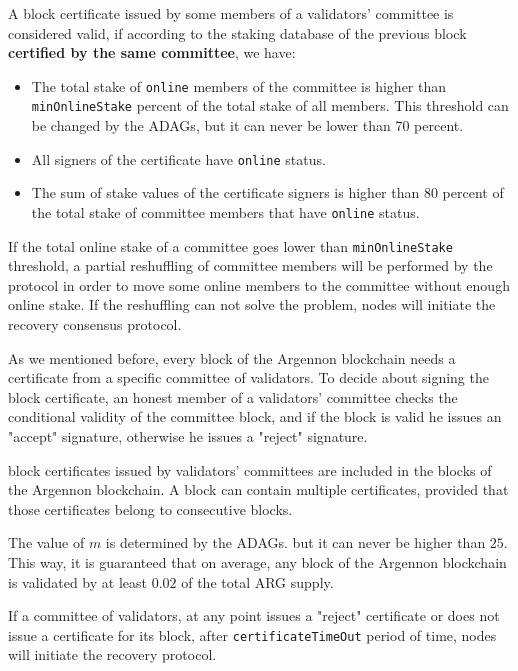 
A block certificate issued by some members of a validators' committee is considered valid, if according to
the staking database of the previous block \textbf{certified by the same committee}, we have:
\begin{itemize}
    \item The total stake of \texttt{online} members of the committee is higher than \texttt{minOnlineStake} percent
    of the total stake of all members. This threshold can be changed by the ADAGs, but it can never be lower
    than 70 percent.
    \item All signers of the certificate have \texttt{online} status.
    \item The sum of stake values of the certificate signers is higher than 80 percent of the total stake
    of committee members that have \texttt{online} status.
\end{itemize}

If the total online stake of a committee goes lower than \texttt{minOnlineStake} threshold, a partial reshuffling
of committee members will be performed by the protocol in order to move some online members to the committee without
enough online stake. If the reshuffling can not solve the problem, nodes will initiate the recovery consensus
protocol.

As we mentioned before, every block of the Argennon blockchain needs a certificate from a specific committee of
validators. To decide about signing the block certificate, an honest member of a
validators' committee checks the conditional validity of the committee block, and if the block is valid he issues
an "accept" signature, otherwise he issues a "reject" signature.

block certificates issued by validators' committees are included in the blocks of the Argennon blockchain.
A block can contain multiple certificates, provided that those certificates belong to consecutive blocks.

The value of $m$ is determined by the ADAGs. but it can never be higher than $25$. This way, it is guaranteed
that on average, any block of the Argennon blockchain is validated by at least $0.02$ of the total ARG supply.

If a committee of validators, at any point issues a "reject" certificate or does not issue a certificate for its
block, after \texttt{certificateTimeOut} period of time,
nodes will initiate the recovery protocol.

